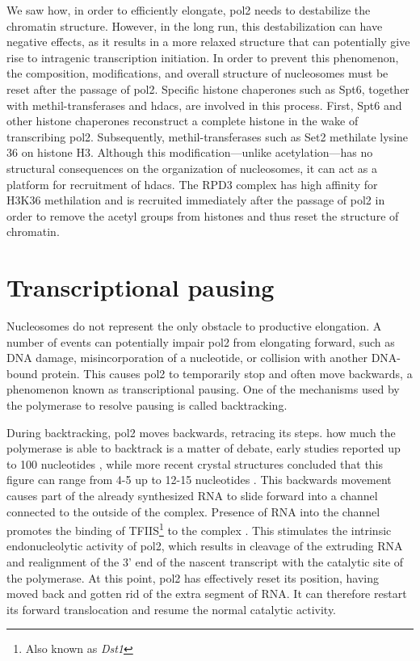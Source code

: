 We saw how, in order to efficiently elongate, \gls{pol2} needs to destabilize the chromatin structure.
However, in the long run, this destabilization can have negative effects, as it results in a more relaxed structure that can potentially give rise to intragenic transcription initiation.
In order to prevent this phenomenon, the composition, modifications, and overall structure of nucleosomes must be reset after the passage of \gls{pol2}. 
Specific histone chaperones such as Spt6, together with methil-transferases and \gls{hdacs}, are involved in this process.
First, Spt6 and other histone chaperones reconstruct a complete histone in the wake of transcribing \gls{pol2}.
Subsequently, methil-transferases such as Set2 methilate lysine 36 on histone H3. 
Although this modification---unlike acetylation---has no structural consequences on the organization of nucleosomes, it can act as a platform for recruitment of \gls{hdacs}.
The RPD3 complex has high affinity for H3K36 methilation and is recruited immediately after the passage of \gls{pol2} in order to remove the acetyl groups from histones and thus reset the structure of chromatin.

\section{Transcriptional pausing} \label{pausing}
Nucleosomes do not represent the only obstacle to productive elongation.
A number of events can potentially impair \gls{pol2} from elongating forward, such as DNA damage, misincorporation of a nucleotide, or collision with another DNA-bound protein.
This causes \gls{pol2} to temporarily stop and often move backwards, a phenomenon known as transcriptional pausing.
One of the mechanisms used by the polymerase to resolve pausing is called backtracking.

During backtracking, \gls{pol2} moves backwards, retracing its steps.
how much the polymerase is able to backtrack \invivo{} is a matter of debate, early \invitro{} studies reported up to 100 nucleotides \cite{pausing}, while more recent crystal structures concluded that this figure can range from 4-5 up to 12-15 nucleotides \citep{cheung:2011:structural}.
This backwards movement causes part of the already synthesized RNA to slide forward into a channel connected to the outside of the complex.
Presence of RNA into the channel promotes the binding of TFIIS\footnote{Also known as \emph{Dst1}} to the complex \citep{cheung:2011:structural}.
This stimulates the intrinsic endonucleolytic activity of \gls{pol2}, which results in cleavage of the extruding RNA and realignment of the 3' end of the nascent transcript with the catalytic site of the polymerase.
At this point, \gls{pol2} has effectively reset its position, having moved back and gotten rid of the extra segment of RNA. 
It can therefore restart its forward translocation and resume the normal catalytic activity.

